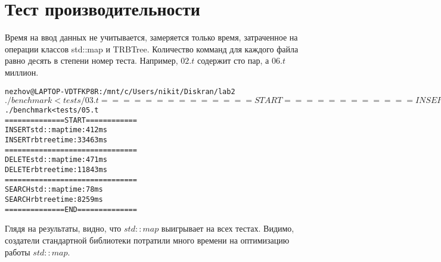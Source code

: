 \section{Тест производительности}
Время на ввод данных не учитывается, замеряется только время, затраченное на операции классов std::map и TRBTree. Количество комманд для каждого файла равно десять в степени номер теста. Например, $02.t$ содержит сто пар, а $06.t$ миллион.

\begin{alltt}
nezhov@LAPTOP-VDTFKP8R:/mnt/c/Users/nikit/Diskran/lab2$ ./benchmark < tests/03.t
==============START============
INSERT std::map time: 4 ms
INSERT rb tree time: 444 ms
===============================
DELETE std::map time: 5 ms
DELETE rb tree time: 65 ms
===============================
SEARCH std::map time: 0 ms
SEARCH rb tree time: 8 ms
==============END==============
nezhov@LAPTOP-VDTFKP8R:/mnt/c/Users/nikit/Diskran/lab2$ ./benchmark < tests/05.t
==============START============
INSERT std::map time: 412 ms
INSERT rb tree time: 33463 ms
===============================
DELETE std::map time: 471 ms
DELETE rb tree time: 11843 ms
===============================
SEARCH std::map time: 78 ms
SEARCH rb tree time: 8259 ms
==============END==============
    
\end{alltt}

Глядя на результаты, видно, что $std::map$ выигрывает на всех тестах. Видимо, создатели стандартной библиотеки потратили много времени на оптимизацию работы $std::map$.
\pagebreak


